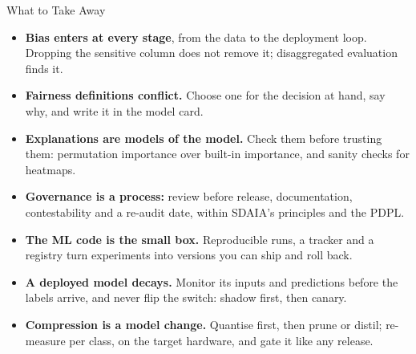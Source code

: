 \begin{frame}{What to Take Away}
    \begin{itemize}
        \setlength\itemsep{0.25em}
        \small
        \item \textbf{Bias enters at every stage}, from the data to the deployment loop. Dropping the sensitive column
              does not remove it; disaggregated evaluation finds it.
        \item \textbf{Fairness definitions conflict.} Choose one for the decision at hand, say why, and write it in the
              model card.
        \item \textbf{Explanations are models of the model.} Check them before trusting them: permutation importance
              over built-in importance, and sanity checks for heatmaps.
        \item \textbf{Governance is a process:} review before release, documentation, contestability and a re-audit
              date, within SDAIA's principles and the PDPL.
        \item \textbf{The ML code is the small box.} Reproducible runs, a tracker and a registry turn experiments into
              versions you can ship and roll back.
        \item \textbf{A deployed model decays.} Monitor its inputs and predictions before the labels arrive, and never
              flip the switch: shadow first, then canary.
        \item \textbf{Compression is a model change.} Quantise first, then prune or distil; re-measure per class, on
              the target hardware, and gate it like any release.
    \end{itemize}
\end{frame}
